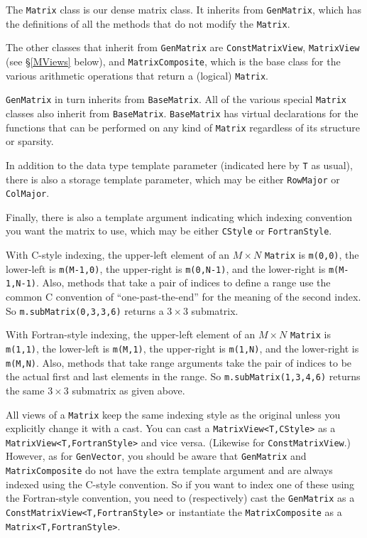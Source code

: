 \documentclass[twoside,letterpaper,11pt]{article}
\renewcommand{\tt}[1]{{\lstinline {#1}}}
\begin{document}
The \tt{Matrix} class is our dense matrix class.  It inherits from \tt{GenMatrix},
which has the definitions of all the methods that 
do not modify the \tt{Matrix}.

The other classes that inherit from \tt{GenMatrix} are \tt{ConstMatrixView},
\tt{MatrixView} (see \S\ref{MViews} below), and \tt{MatrixComposite}, which 
is the base class for the various arithmetic operations that return a 
(logical) \tt{Matrix}.  

\tt{GenMatrix} in turn inherits from \tt{BaseMatrix}.  All of the various
special \tt{Matrix} classes also inherit from \tt{BaseMatrix}.
\tt{BaseMatrix} has virtual declarations for the functions that can be 
performed on any kind of \tt{Matrix} regardless of its structure or sparsity.

In addition to the data type template parameter (indicated here by \tt{T} as usual),
there is also a storage template parameter, which may be either 
\tt{RowMajor} or \tt{ColMajor}.

Finally, there is also a template argument indicating which indexing convention
you want the matrix to use, which may be either \tt{CStyle} or 
\tt{FortranStyle}.

With C-style indexing, the upper-left element of an $M \times N$ \tt{Matrix} is
\tt{m(0,0)}, the lower-left is \tt{m(M-1,0)}, the upper-right is \tt{m(0,N-1)},
and the lower-right is \tt{m(M-1,N-1)}.  Also, methods that take a pair of 
indices to define a range use the common C convention of ``one-past-the-end'' 
for the meaning of the second index.
So \tt{m.subMatrix(0,3,3,6)} returns a $3 \times 3$ submatrix.

With Fortran-style indexing, the upper-left element of an $M \times N$ \tt{Matrix}
is \tt{m(1,1)}, the lower-left is \tt{m(M,1)}, the upper-right is \tt{m(1,N)},
and the lower-right is \tt{m(M,N)}.  Also, methods that take range arguments
take the pair of indices to be the actual first and last elements in the range.
So \tt{m.subMatrix(1,3,4,6)} returns the same $3 \times 3$ submatrix as given above.

All views of a \tt{Matrix} keep the same indexing style as the original unless you
explicitly change it with a cast.  You can cast a \tt{MatrixView<T,CStyle>}
as a \tt{MatrixView<T,FortranStyle>} and vice versa.  (Likewise for 
\tt{ConstMatrixView}.)  However, as for \tt{GenVector}, you should be
aware that \tt{GenMatrix}
and \tt{MatrixComposite} do not have the extra template argument and are always
indexed using the C-style convention.  So if you want to index one of these 
using the Fortran-style convention, you need to (respectively) cast the 
\tt{GenMatrix} as a \tt{ConstMatrixView<T,FortranStyle>} or instantiate the
\tt{MatrixComposite} as a \tt{Matrix<T,FortranStyle>}.
\end{document}
